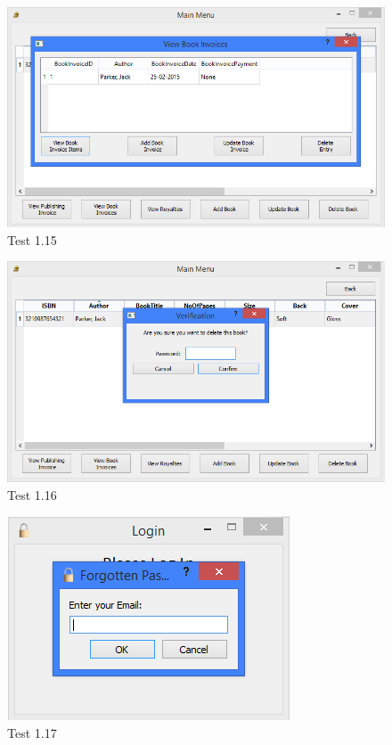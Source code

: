 \begin{landscape}
\begin{figure}[H]
    \includegraphics[width=\textwidth]{./Testing/Evidence/ViewBookInvoiceButtonTest.png}
    \caption{Test 1.15}  \label{fig:ViewBookInvoiceButtonTest}
\end{figure}

\begin{figure}[H]
    \includegraphics[width=\textwidth]{./Testing/Evidence/DeleteBookButtonTest.png}
    \caption{Test 1.16}  \label{fig:DeleteBookButtonTest}
\end{figure}

\begin{figure}[H]
    \includegraphics[width=\textwidth]{./Testing/Evidence/ForgotPasswordLabelTest.png}
    \caption{Test 1.17}  \label{fig:ForgotPasswordLabelTest}
\end{figure}


\end{landscape}
